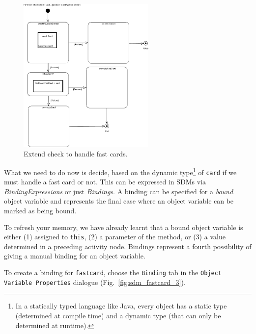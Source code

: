 \begin{figure}[htbp]
\begin{center}
  \includegraphics[width=0.6\textwidth]{pics/sdmBilder/bindings/fastcard_controlflow.pdf}
  \caption{Extend check to handle fast cards.}  
  \label{fig:sdm_fastcard_2}
\end{center}
\end{figure}

What we need to do now is decide, based on the dynamic
type\footnote{In a statically typed language like Java, every object has a
static type (determined at compile time) and a dynamic type (that can only be
determined at runtime).} of \texttt{card} if we must handle a fast card or not.
This can be expressed in SDMs via \emph{BindingExpressions} or just
\emph{Bindings}.  A binding can be specified for a \emph{bound} object variable
and represents the final case where an object variable can be marked as being
bound.  

To refresh your memory, we have already learnt that a bound object
variable is either (1) assigned to \texttt{this}, (2) a parameter of the method,
or (3) a value determined in a preceding activity node.  Bindings represent a
fourth possibility of giving a manual binding for an object variable. 

To create a binding for \texttt{fastcard}, choose the \texttt{Binding} tab in
the \texttt{Object Variable Properties} dialogue
(Fig.~\ref{fig:sdm_fastcard_3}). 

